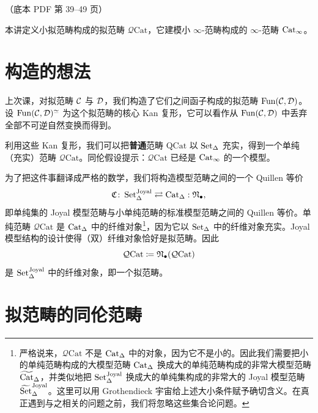 \begin{center}\small\color{black!55}（底本 PDF 第 39–49 页）\end{center}

本讲定义小拟范畴构成的拟范畴 $\mathcal{Q}\mathrm{Cat}$，它建模小 $\infty$-范畴构成的 $\infty$-范畴 $\operatorname{Cat}_\infty$。

\section{构造的想法}

\nitem\label{L5-1.1} 上次课，对拟范畴 $\mathcal{C}$ 与 $\mathcal{D}$，我们构造了它们之间函子构成的拟范畴 $\operatorname{Fun}(\mathcal{C},\mathcal{D})$。设 $\operatorname{Fun}(\mathcal{C},\mathcal{D})^{\simeq}$ 为这个拟范畴的核心 Kan 复形，它可以看作从 $\operatorname{Fun}(\mathcal{C},\mathcal{D})$ 中丢弃全部不可逆自然变换而得到。

\nitem\label{L5-1.2} 利用这些 Kan 复形，我们可以把\textbf{普通}范畴 $\mathrm{QCat}$ 以 $\operatorname{Set}_\Delta$ 充实，得到一个单纯（充实）范畴 $\mathcal{Q}\mathrm{Cat}$。同伦假设提示：$\mathcal{Q}\mathrm{Cat}$ 已经是 $\operatorname{Cat}_\infty$ 的一个模型。

\nitem\label{L5-1.3} 为了把这件事翻译成严格的数学，我们将构造模型范畴之间的一个 Quillen 等价
\[
\mathfrak{C}\colon\operatorname{Set}^{\mathrm{Joyal}}_\Delta\rightleftarrows\operatorname{Cat}_\Delta:\mathfrak{N}_{\bullet},
\]
即单纯集的 Joyal 模型范畴与小单纯范畴的标准模型范畴之间的 Quillen 等价。单纯范畴 $\mathcal{Q}\mathrm{Cat}$ 是 $\operatorname{Cat}_\Delta$ 中的纤维对象\footnote{\linespread{1.45}\selectfont 严格说来，$\mathcal{Q}\mathrm{Cat}$ 不是 $\operatorname{Cat}_\Delta$ 中的对象，因为它不是小的。因此我们需要把小的单纯范畴构成的大模型范畴 $\operatorname{Cat}_\Delta$ 换成大的单纯范畴构成的非常大模型范畴 $\widetilde{\operatorname{Cat}}_\Delta$，并类似地把 $\operatorname{Set}^{\mathrm{Joyal}}_\Delta$ 换成大的单纯集构成的非常大的 Joyal 模型范畴 $\widetilde{\operatorname{Set}}^{\mathrm{Joyal}}_\Delta$。这里可以用 Grothendieck 宇宙给上述大小条件赋予确切含义。在真正遇到与之相关的问题之前，我们将忽略这些集合论问题。}，因为它以 $\operatorname{Set}_\Delta$ 中的纤维对象充实。Joyal 模型结构的设计使得（双）纤维对象恰好是拟范畴。因此
\[
\mathcal{Q}\mathrm{Cat}\coloneqq\mathfrak{N}_{\bullet}(\mathcal{Q}\mathrm{Cat})
\]
是 $\operatorname{Set}^{\mathrm{Joyal}}_\Delta$ 中的纤维对象，即一个拟范畴。

\section{拟范畴的同伦范畴}


